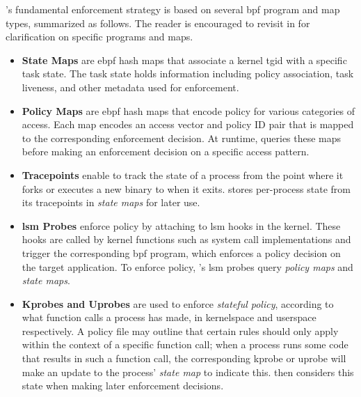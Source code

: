 \bpfbox{}'s fundamental enforcement strategy is based on several \gls{bpf} program and map
types, summarized as follows. The reader is encouraged to revisit
 in  for clarification on
specific programs and maps.

\begin{itemize}
  \item \textbf{State Maps} are \gls{ebpf} hash maps that associate a kernel \gls{tgid}
  with a specific task state. The task state holds information including policy
  association, task liveness, and other metadata used for enforcement.

  \item \textbf{Policy Maps} are \gls{ebpf} hash maps that encode \bpfbox{} policy for
  various categories of access. Each map encodes an access vector and policy ID pair that
  is mapped to the corresponding enforcement decision. At runtime, \bpfbox{} queries these
  maps before making an enforcement decision on a specific access pattern.

  \item \textbf{Tracepoints} enable \bpfbox{} to track the state of a process from the
  point where it forks or executes a new binary to when it exits. \bpfbox{} stores
  per-process state from its tracepoints in \textit{state maps} for later use.

  \item \textbf{\gls{lsm} Probes} enforce policy by attaching to \gls{lsm} hooks in the
  kernel. These hooks are called by kernel functions such as system call implementations
  and trigger the corresponding \gls{bpf} program, which enforces a policy decision on the
  target application. To enforce policy, \bpfbox{}'s \gls{lsm} probes query \textit{policy
  maps} and \textit{state maps}.

  \item \textbf{Kprobes and Uprobes} are used to enforce \textit{stateful policy},
  according to what function calls a process has made, in kernelspace and userspace
  respectively. A \bpfbox{} policy file may outline that certain rules should only apply
  within the context of a specific function call; when a process runs some code that
  results in such a function call, the corresponding kprobe or uprobe will make an update
  to the process' \textit{state map} to indicate this. \bpfbox{} then considers this state
  when making later enforcement decisions.
\end{itemize}


